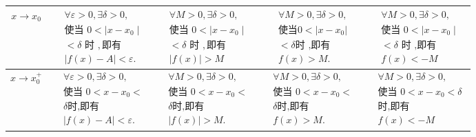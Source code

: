 \documentclass[12pt, a4paper, oneside, UTF8]{ctexbook}
\begin{document}
\begin{sloppypar}
\begin{center}
{            \hline
        }
        \begin{supertabular}{|c|c|c|c|c|}
            \hline
            $x \to x_0$       & $\begin{aligned}&\forall\varepsilon>0,\exists\delta>0, \\&\text{使当 }0<\mid x-x_0\mid  \\&<\delta\text{ 时 },\text{即有} \\&|f(x)-A|<\varepsilon.\end{aligned}$ & $\begin{aligned}&\forall M>0,\exists\delta>0, \\&\text{使当 }0<\mid x-x_{0}\mid  \\&<\delta\text{ 时 },\text{即有}\\& |f(x)|>M\end{aligned}$ & $\begin{aligned}&\forall M>0,\exists\delta>0, \\&\text{使当} 0<|x-x_0| \\ &<\delta \text{时 ,即有} \\ &f(x)>M.\end{aligned}$      & $\begin{aligned}&\forall M>0,\exists\delta>0, \\&\text{使当 }0<\mid x-x_{0}\mid  \\&<\delta\text{ 时 ,即有}\\& f(x) <-M\end{aligned}$ \\ \hline
            $x \to x_0^+$     & $\begin{aligned}&\forall\varepsilon>0,\exists\delta>0, \\&\text{使当 }0<x-x_{0}< \\&\delta \text{时,即有}\\&|f(x)-A|<\varepsilon.\end{aligned}$                  & $\begin{aligned}&\forall M>0,\exists\delta>0, \\&\text{使当 }0<x-x_{0}< \\&\delta \text{时,即有} \\&|f(x)|>M.\end{aligned}$                  & $\begin{aligned}&\forall M>0,\exists\delta>0, \\&\text{使当 }0<x-x_{0}< \\&\delta \text{时,即有} \\&f(x)>M.\end{aligned}$         & $\begin{aligned}&\forall M>0,\exists\delta>0, \\&\text{使当 }0<x-x_{0}<\delta  \\&\text{时,即有} \\& f(x) <-M\end{aligned} $          \\ \hline

\end{supertabular}
\end{center}
\end{sloppypar}
\end{document}
